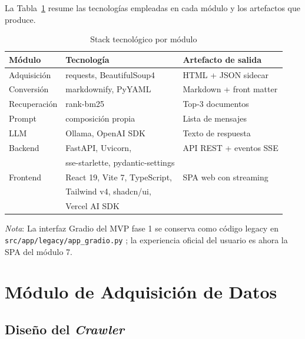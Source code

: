 \documentclass[conference]{IEEEtran}
\newcommand{\code}[1]{\texttt{\small #1}}
\begin{document}
La Tabla~\ref{tab:stack} resume las tecnologías empleadas en cada módulo y
los artefactos que produce.

\begin{table}[ht]
\centering
\caption{Stack tecnológico por módulo}
\label{tab:stack}
\setlength{\tabcolsep}{4pt}
\begin{tabular}{@{}lll@{}}
\toprule
\textbf{Módulo} & \textbf{Tecnología} & \textbf{Artefacto de salida} \\
\midrule
Adquisición  & requests, BeautifulSoup4      & HTML + JSON sidecar     \\
Conversión   & markdownify, PyYAML           & Markdown + front matter \\
Recuperación & rank-bm25                     & Top-3 documentos        \\
Prompt       & composición propia            & Lista de mensajes       \\
LLM          & Ollama, OpenAI SDK            & Texto de respuesta      \\
Backend      & FastAPI, Uvicorn,             & API REST + eventos SSE  \\
             & sse-starlette, pydantic-settings &                      \\
Frontend     & React 19, Vite 7, TypeScript, & SPA web con streaming   \\
             & Tailwind v4, shadcn/ui,       &                         \\
             & Vercel AI SDK                 &                         \\
\bottomrule
\end{tabular}
\end{table}

\textit{Nota}: La interfaz Gradio del MVP fase 1 se conserva como código
legacy en \code{src/app/legacy/app\_gradio.py}
\cite{abid2019gradio}; la experiencia oficial del usuario es ahora la SPA
del módulo 7.

\section{Módulo de Adquisición de Datos}
\label{sec:scraping}

\subsection{Diseño del \textit{Crawler}}
\end{document}
